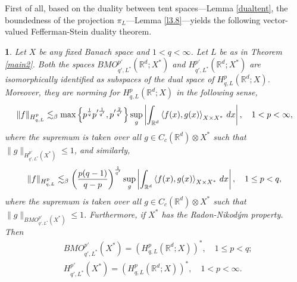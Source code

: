 \documentclass[oneside,english,a4wide]{amsart}
\numberwithin{equation}{section}
\numberwithin{figure}{section}
\theoremstyle{plain}
\newtheorem{thm}{\protect\theoremname}[section]
\theoremstyle{plain}
\theoremstyle{definition}
\theoremstyle{plain}
\theoremstyle{remark}
\theoremstyle{definition}
\theoremstyle{remark}
\theoremstyle{definition}
\providecommand{\theoremname}{Theorem}
\newcommand{\real}{{\mathbb R}}
\newcommand{\ot}{\otimes}
\newcommand{\8}{+\infty}
\renewcommand{\1}{\mathbbm{1}}
\newcommand\jdz[1]{ \left| #1 \right| }
\newcommand\sk[1]{ \left( #1 \right) }
\newcommand\lk[1]{ \left\{ #1 \right\} }
\newcommand{\lara}[1]{\left\langle #1 \right\rangle}
\renewcommand\d{{\rm d}}
\begin{document}
{ 
 First of all, based on the duality between tent spaces---Lemma \ref{dualtent},  the boundedness of the projection $\pi_L$---Lemma \ref{l3.8}---yields the following vector-valued Fefferman-Stein duality theorem.
\begin{thm}\label{Dual}
Let $X$ be any fixed Banach space and $1<q<\infty$. Let $L$ be as in Theorem \ref{main2}. Both the spaces $BMO_{q', L^*}^{p'}(\real^d; X^*)$ and $H^{p'}_{q', L^*}(\real^d; X^*)$ are isomorphically identified as subspaces of the dual space of $H^p_{q, L}(\real^d; X)$. Moreover, they are norming for $H^p_{q, L}(\real^d; X)$ in the following sense, 
    \[
        \| f \|_{ H^p_{q, L} } \lesssim_{\beta} \max\lk{ p^{\frac{1}{q}}p'^{\frac{1}{q'}}, p'^{\frac{2}{q'}} } \sup_g \jdz{ \int_{\real^d} \lara{ f(x), g(x) }_{X \times X^*} \,\d x }, \quad 1 < p < \infty,     
    \]
    where the supremum is taken over all $g \in C_c(\real^d) \ot X^*$ such that $\|g\|_{H^{p'}_{q',L^*}(X^*)}\leq 1$, and similarly,
    \[
        \| f \|_{ H^p_{q, L} } \lesssim_{\beta} \sk{\frac{p(q-1)}{q-p}}^{\frac{1}{q'}} \sup_g \jdz{ \int_{\real^d} \lara{ f(x), g(x) }_{X \times X^*} \,\d x }, \quad 1 \leq p < q,     
    \]
    where the supremum is taken over all $g \in C_c(\real^d) \ot X^*$ such that $\|g\|_{BMO^{p'}_{q',L^*}(X^*)}\leq 1$.    
    Furthermore, if $X^*$ has the Radon-Nikod{\'y}m property. Then 
    \[
    \begin{aligned}
        & BMO^{p'}_{q', L^*}(X^*) = \sk{ H^p_{q, L}(\real^d; X) }^*,\quad 1 \leq p < q ;\\
        & H^{p'}_{q', L^*}(X^*)= \sk{ H^p_{q, L}(\real^d; X)}^*,  \quad 1 < p < \infty.
    \end{aligned}
    \]
\end{thm}

}
\end{document}

